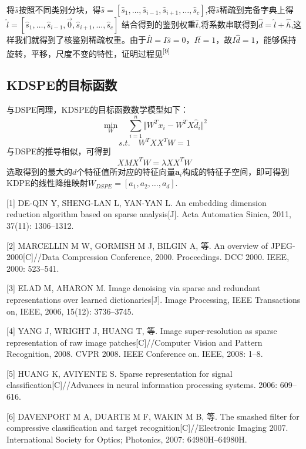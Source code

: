 \documentclass[bachelor,zhspacing]{cqu}  %
\begin{document}
将\(\hat{s}\)按照不同类别分块，得\(\hat{s}=[\hat{s}_{1},\ldots,\hat{s}_{i-1},\hat{s}_{i+1},\ldots,\hat{s}_{c}]\),将\(\hat{s}\)稀疏到完备字典上得\(\hat{l}=[\hat{s}_{1},\ldots,\hat{s}_{i-1},\vec{0},\hat{s}_{i+1},\ldots,\hat{s}_{c}]\)
结合得到的鉴别权重\(\hat{t}\),将系数串联得到\(\hat{d}=\hat{l}+\hat{h}\),这样我们就得到了核鉴别稀疏权重。由于\(I\hat{l}=I\hat{s}=0\)，\(I\hat{t}=1\)，故\(I\hat{d}=1\)，能够保持旋转，平移，尺度不变的特性，证明过程见\textsuperscript{{[}9{]}}

\subsection{KDSPE的目标函数}\label{kdspeux7684ux76eeux6807ux51fdux6570}

与DSPE同理，KDSPE的目标函数数学模型如下：
\[\min_{W}\quad\sum_{i=1}^{n}\Vert{W^{T}x_{i}-W^{T}X\hat{d}_{i}}\Vert^{2}\]
\[s.t.\quad W^{T}XX^{T}W = 1\] 与DSPE的推导相似，可得到
\[XMX^{T}W = \lambda XX^{T}W\]
选取得到的最大的\(d\)个特征值所对应的特征向量\(\mathbf{a}_{i}\)构成的特征子空间，即可得到KDPE的线性降维映射\(W_{DSPE}=[a_{1},a_{2},\ldots,a_{d}]\).

\hypertarget{refs}{}
\hypertarget{ref-de2011embedding}{}
{[}1{]} DE-QIN Y, SHENG-LAN L, YAN-YAN L. An embedding dimension
reduction algorithm based on sparse analysis{[}J{]}. Acta Automatica
Sinica, 2011, 37(11): 1306--1312.

\hypertarget{ref-marcellin2000overview}{}
{[}2{]} MARCELLIN M W, GORMISH M J, BILGIN A, 等. An overview of
JPEG-2000{[}C{]}//Data Compression Conference, 2000. Proceedings. DCC
2000. IEEE, 2000: 523--541.

\hypertarget{ref-elad2006image}{}
{[}3{]} ELAD M, AHARON M. Image denoising via sparse and redundant
representations over learned dictionaries{[}J{]}. Image Processing, IEEE
Transactions on, IEEE, 2006, 15(12): 3736--3745.

\hypertarget{ref-yang2008image}{}
{[}4{]} YANG J, WRIGHT J, HUANG T, 等. Image super-resolution as sparse
representation of raw image patches{[}C{]}//Computer Vision and Pattern
Recognition, 2008. CVPR 2008. IEEE Conference on. IEEE, 2008: 1--8.

\hypertarget{ref-huang2006sparse}{}
{[}5{]} HUANG K, AVIYENTE S. Sparse representation for signal
classification{[}C{]}//Advances in neural information processing
systems. 2006: 609--616.

\hypertarget{ref-davenport2007smashed}{}
{[}6{]} DAVENPORT M A, DUARTE M F, WAKIN M B, 等. The smashed filter for
compressive classification and target recognition{[}C{]}//Electronic
Imaging 2007. International Society for Optics; Photonics, 2007:
64980H--64980H.
\end{document}

